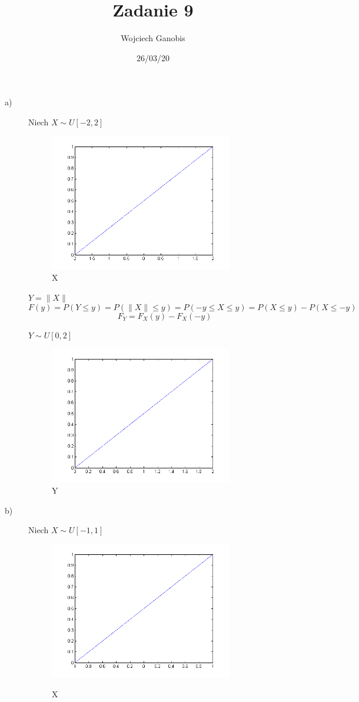 \documentclass[12pt]{article}
\title{Zadanie 9}
\author{Wojciech Ganobis}
\date{26/03/20}
\begin{document}
\begin{description}
  \item[a)]
  
 Niech $X \sim U [-2, 2]$

\begin{figure}[h]
	\centering
   
		\includegraphics[width=8cm]{aX}
		\caption{X}
\end{figure}

  $Y = \|X\|$
  $$F(y) = P(Y \leq y) = P(\|X\| \leq y) = P(-y \leq X \leq y) = P(X \leq y) - P(X \leq -y)$$
  $$F_{Y} = F_{X}(y) - F_{X}(-y)$$
  
  $Y \sim U[0, 2]$
\begin{figure}[h]
	\centering
   
		\includegraphics[width=8cm]{aY}
		\caption{Y}
\end{figure}
  
  \item[b)] 
  
   Niech $X \sim U [-1, 1]$\\

   \begin{figure}[h]
	\centering
   
		\includegraphics[width=8cm]{bX}\\
		\caption{X}
\end{figure}
   \begin {itemize}
   

\end{itemize}
\end{description}
\end{document}
